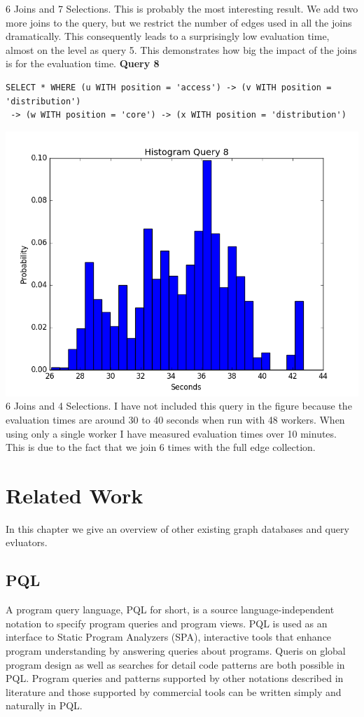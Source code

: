 \documentclass[11pt,singlecolumn]{scrartcl}
\begin{document}
6 Joins and 7 Selections. This is probably the most interesting result. We add two more joins to the query, but we restrict the number of edges used in all the joins dramatically. This consequently leads to a surprisingly low evaluation time, almost on the level as query 5. This demonstrates how big the impact of the joins is for the evaluation time.
\clearpage
\textbf{Query 8}\\
\begin{verbatim}
SELECT * WHERE (u WITH position = 'access') -> (v WITH position = 'distribution')
 -> (w WITH position = 'core') -> (x WITH position = 'distribution')\end{verbatim}
\includegraphics[width=1\textwidth]{q81}
6 Joins and 4 Selections. I have not included this query in the figure because the evaluation times are around 30 to 40 seconds when run with 48 workers. When using only a single worker I have measured evaluation times over 10 minutes. This is due to the fact that we join 6 times with the full edge collection.
\clearpage

\section{Related Work}
In this chapter we give an overview of other existing graph databases and query evluators.

\subsection{PQL}
A program query language, PQL for short, is a source language-independent notation to specify program queries and program views. PQL is used as an interface to Static Program Analyzers (SPA), interactive tools that enhance program understanding by answering queries about programs. Queris on global program design as well as searches for detail code patterns are both possible in PQL. Program queries and patterns supported by other notations described in literature and those supported by commercial tools can be written simply and naturally in PQL.\cite {PQL}
\end{document}
